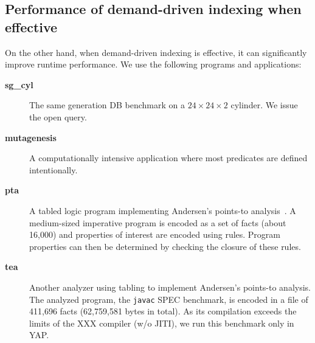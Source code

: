 \documentclass{llncs}
\newcommand{\JITI}{demand-driven indexing\xspace}
\newcommand{\bench}[1]{\textbf{\textsf{#1}}}
\newcommand{\sgCyl}{\bench{sg\_cyl}\xspace}
\newcommand{\muta}{\bench{mutagenesis}\xspace}
\newcommand{\pta}{\bench{pta}\xspace}
\newcommand{\tea}{\bench{tea}\xspace}
\newcommand{\TODOcomment}[2]{%
  \stepcounter{TODOcounter#1}%
  {\scriptsize\bf$^{(\arabic{TODOcounter#1})}$}%
  \marginpar[\fbox{
    \parbox{2cm}{\raggedleft
      \scriptsize$^{({\bf{\arabic{TODOcounter#1}{#1}}})}$%
      \scriptsize #2}}]%
  {\fbox{\parbox{2cm}{\raggedright
      \scriptsize$^{({\bf{\arabic{TODOcounter#1}{#1}}})}$%
      \scriptsize #2}}}
}%
\newcounter{TODOcounter}
\newcommand{\TODO}[1]{\TODOcomment{}{#1}}
\begin{document}
\subsection{Performance of \JITI when effective} \label{sec:perf:effective}
On the other hand, when \JITI is effective, it can significantly
improve runtime performance. We use the following programs and
applications:
\begin{small}
\begin{description}
\item[\sgCyl] The same generation DB benchmark on a $24 \times 24
  \times 2$ cylinder. We issue the open query.
\item[\muta] A computationally intensive application where most
  predicates are defined intentionally.
\item[\pta] A tabled logic program implementing Andersen's points-to
  analysis~\cite{anderson-phd}. A medium-sized imperative program is
  encoded as a set of facts (about 16,000) and properties of interest
  are encoded using rules. Program properties can then be determined
  by checking the closure of these rules.
\item[\tea] Another analyzer using tabling to implement Andersen's
  points-to analysis. The analyzed program, the \texttt{javac} SPEC
  benchmark, is encoded in a file of 411,696 facts (62,759,581 bytes
  in total). As its compilation exceeds the limits of the XXX compiler
  (w/o JITI), we run this benchmark only in YAP.
\end{description}
\end{small}
\end{document}
